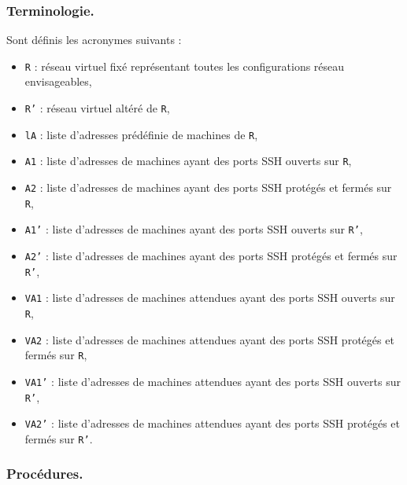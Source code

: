 \documentclass[a4paper,11pt,french]{article}
\begin{document}
\subsubsection*{Terminologie.}
Sont définis les acronymes suivants : 
\begin{itemize}
	\item \texttt{R} : réseau virtuel fixé représentant toutes les configurations réseau envisageables,
	\item \texttt{R'} : réseau virtuel altéré de \texttt{R},
	\item \texttt{lA} : liste d'adresses prédéfinie de machines de \texttt{R},
	\item \texttt{A1} : liste d'adresses de machines ayant des ports SSH ouverts sur \texttt{R},
	\item \texttt{A2} : liste d'adresses de machines ayant des ports SSH protégés et fermés sur \texttt{R},
	\item \texttt{A1'} : liste d'adresses de machines ayant des ports SSH ouverts sur \texttt{R'},
	\item \texttt{A2'} : liste d'adresses de machines ayant des ports SSH protégés et fermés sur \texttt{R'},
	\item \texttt{VA1} : liste d'adresses de machines attendues ayant des ports SSH ouverts sur \texttt{R},
	\item \texttt{VA2} : liste d'adresses de machines attendues ayant des ports SSH protégés et fermés sur \texttt{R},
	\item \texttt{VA1'} : liste d'adresses de machines attendues ayant des ports SSH ouverts sur \texttt{R'},
	\item \texttt{VA2'} : liste d'adresses de machines attendues ayant des ports SSH protégés et fermés sur \texttt{R'}.
\end{itemize}


\subsubsection*{Procédures.}
\end{document}
